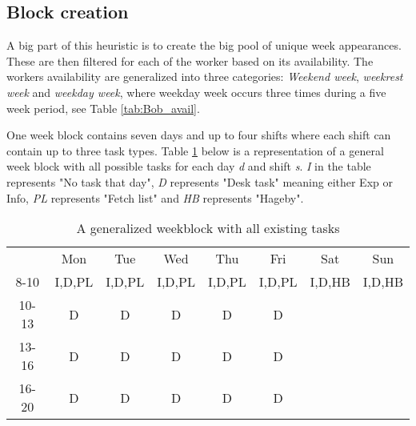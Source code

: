 \subsection{Block creation} \label{block_creation}
A big part of this heuristic is to create the big pool of unique week appearances. These are then filtered for each of the worker based on its availability. The workers availability are generalized into three categories: \textit{Weekend week}, \textit{weekrest week} and \textit{weekday week}, where weekday week occurs three times during a five week period, see Table \ref{tab:Bob_avail}. 


One week block contains seven days and up to four shifts where each shift can contain up to three task types. Table \ref{Generalized weekblock} below is a representation of a general week block with all possible tasks for each day \textit{d} and shift \textit{s}. \textit{I} in the table represents "No task that day", \textit{D} represents "Desk task" meaning either Exp or Info, \textit{PL} represents "Fetch list" and \textit{HB} represents "Hageby". 

\begin{table}[!h]
\centering
\caption{A generalized weekblock with all existing tasks}
\label{Generalized weekblock}
\begin{tabular}{cccccccc}
                         & Mon                         & Tue                         & Wed                         & Thu                         & Fri                         & Sat                         & Sun                         \\ \cline{2-8} 
\multicolumn{1}{c|}{8-10} & \multicolumn{1}{c|}{I,D,PL} & \multicolumn{1}{c|}{I,D,PL} & \multicolumn{1}{c|}{I,D,PL} & \multicolumn{1}{c|}{I,D,PL} & \multicolumn{1}{c|}{I,D,PL} & \multicolumn{1}{c|}{I,D,HB} & \multicolumn{1}{c|}{I,D,HB} \\ \cline{2-8} 
\multicolumn{1}{c|}{10-13} & \multicolumn{1}{c|}{D}      & \multicolumn{1}{c|}{D}      & \multicolumn{1}{c|}{D}      & \multicolumn{1}{c|}{D}      & \multicolumn{1}{c|}{D}      &       \\ \cline{2-6} 
\multicolumn{1}{c|}{13-16} & \multicolumn{1}{c|}{D}      & \multicolumn{1}{c|}{D}      & \multicolumn{1}{c|}{D}      & \multicolumn{1}{c|}{D}      & \multicolumn{1}{c|}{D}      &       \\ \cline{2-6} 
\multicolumn{1}{c|}{16-20} & \multicolumn{1}{c|}{D}      & \multicolumn{1}{c|}{D}      & \multicolumn{1}{c|}{D}      & \multicolumn{1}{c|}{D}      & \multicolumn{1}{c|}{D}      &       \\ \cline{2-6} 
\end{tabular}
\end{table}

